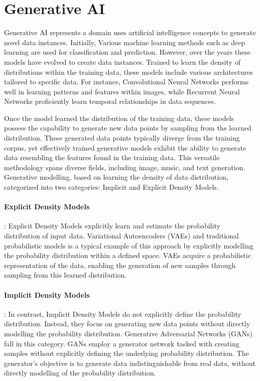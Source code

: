 \documentclass[12pt,twoside,a4paper,parskip]{scrbook} %
\begin{document}
\section{Generative AI}
Generative AI represents a domain uses artificial intelligence concepts to generate novel data instances. Initially, Various machine learning methods such as deep learning are used for classification and prediction. However, over the years these models have evolved to create data instances. Trained to learn the density of distributions within the training data, these models include various architectures tailored to specific data. For instance, Convolutional Neural Networks performs well in learning patterns and features within images, while Recurrent Neural Networks proficiently learn temporal relationships in data sequences.


Once the model learned the distribution of the training data, these models possess the capability to generate new data points by sampling from the learned distribution. These generated data points typically diverge from the training corpus, yet effectively trained generative models exhibit the ability to generate data resembling the features found in the training data. This versatile methodology spans diverse fields, including image, music, and text generation. Generative modelling, based on learning the density of data distribution, categorized into two categories: Implicit and Explicit Density Models.

\paragraph*{Explicit Density Models}:
Explicit Density Models explicitly learn and estimate the probability distribution of input data. Variational Autoencoders (VAEs) and traditional probabilistic models is a typical example of this approach by explicitly modelling the probability distribution within a defined space. VAEs acquire a probabilistic representation of the data, enabling the generation of new samples through sampling from this learned distribution.

\paragraph*{Implicit Density Models}:
In contrast, Implicit Density Models do not explicitly define the probability distribution. Instead, they focus on generating new data points without directly modelling the probability distribution. Generative Adversarial Networks (GANs) fall in this category. GANs employ a generator network tasked with creating samples without explicitly defining the underlying probability distribution. The generator's objective is to generate data indistinguishable from real data, without directly modelling of the probability distribution.
\end{document}
